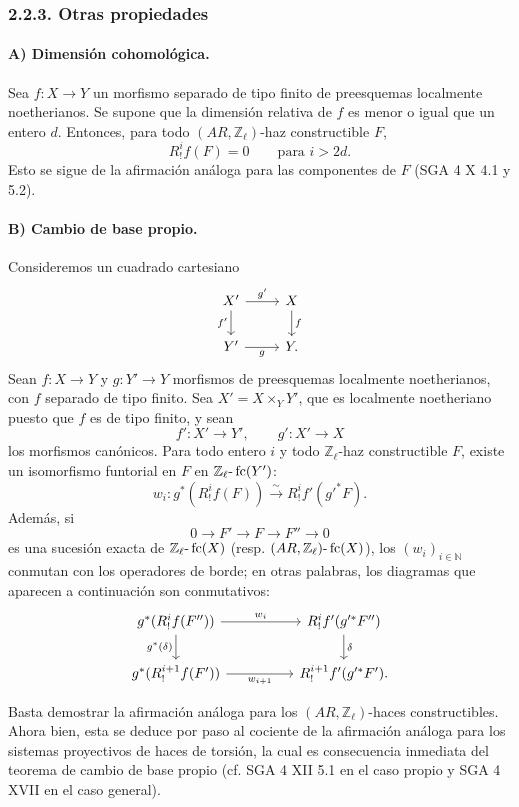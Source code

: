 \subsubsection*{2.2.3. Otras propiedades}

\paragraph{A) Dimensión cohomológica.}
Sea \(f:X\to Y\) un morfismo separado de tipo finito de preesquemas localmente noetherianos. Se supone que la dimensión relativa de \(f\) es menor o igual que un entero \(d\). Entonces, para todo \((AR,\mathbb Z_\ell)\)-haz constructible \(F\),
\[
R^i_!f(F)=0\qquad\text{para }i>2d.
\]
Esto se sigue de la afirmación análoga para las componentes de \(F\) (SGA 4 X 4.1 y 5.2).

\paragraph{B) Cambio de base propio.}
Consideremos un cuadrado cartesiano
\[
\begin{tikzcd}
X' \arrow[r,"g'"] \arrow[d,"f'"'] & X \arrow[d,"f"]\\
Y' \arrow[r,"g"'] & Y .
\end{tikzcd}
\]
Sean \(f:X\to Y\) y \(g:Y'\to Y\) morfismos de preesquemas localmente noetherianos, con \(f\) separado de tipo finito. Sea \(X'=X\times_Y Y'\), que es localmente noetheriano puesto que \(f\) es de tipo finito, y sean
\[
f':X'\to Y',\qquad g':X'\to X
\]
los morfismos canónicos. Para todo entero \(i\) y todo \(\mathbb Z_\ell\)-haz constructible \(F\), existe un isomorfismo funtorial en \(F\) en \(\mathbb Z_\ell\text{-}\operatorname{fc}(Y')\):
\[
w_i:g^*(R^i_!f(F))\xrightarrow{\sim} R^i_!f'(g'^*F).
\]
Además, si
\[
0\longrightarrow F'\longrightarrow F\longrightarrow F''\longrightarrow 0
\]
es una sucesión exacta de \(\mathbb Z_\ell\text{-}\operatorname{fc}(X)\) (resp. \((AR,\mathbb Z_\ell)\text{-}\operatorname{fc}(X)\)), los \((w_i)_{i\in\mathbb N}\) conmutan con los operadores de borde; en otras palabras, los diagramas que aparecen a continuación son conmutativos:
\[
\begin{tikzcd}[column sep=huge]
g^*(R^i_!f(F'')) \arrow[r,"w_i"] \arrow[d,"g^*(\delta)"']
&
R^i_!f'(g'^*F'') \arrow[d,"\delta"]\\
g^*(R^{i+1}_!f(F')) \arrow[r,"w_{i+1}"']
&
R^{i+1}_!f'(g'^*F').
\end{tikzcd}
\]

\begin{prooftext}[Demostración]
Basta demostrar la afirmación análoga para los \((AR,\mathbb Z_\ell)\)-haces constructibles. Ahora bien, esta se deduce por paso al cociente de la afirmación análoga para los sistemas proyectivos de haces de torsión, la cual es consecuencia inmediata del teorema de cambio de base propio (cf. SGA 4 XII 5.1 en el caso propio y SGA 4 XVII en el caso general).
\end{prooftext}
